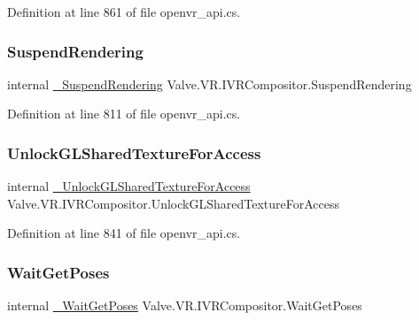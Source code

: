 Definition at line 861 of file openvr\+\_\+api.\+cs.

\mbox{\label{struct_valve_1_1_v_r_1_1_i_v_r_compositor_a9a65d3f0ab17d11d1771dcd4167d9092}} 
\subsubsection{\texorpdfstring{SuspendRendering}{SuspendRendering}}
{\footnotesize\ttfamily internal \mbox{\hyperlink{struct_valve_1_1_v_r_1_1_i_v_r_compositor_a52c4de7b702770e872b7ef001d8c6b32}{\+\_\+\+Suspend\+Rendering}} Valve.\+V\+R.\+I\+V\+R\+Compositor.\+Suspend\+Rendering}



Definition at line 811 of file openvr\+\_\+api.\+cs.

\mbox{\label{struct_valve_1_1_v_r_1_1_i_v_r_compositor_afee8c0932af2f5331c01b76b5023df45}} 
\subsubsection{\texorpdfstring{UnlockGLSharedTextureForAccess}{UnlockGLSharedTextureForAccess}}
{\footnotesize\ttfamily internal \mbox{\hyperlink{struct_valve_1_1_v_r_1_1_i_v_r_compositor_ad503ea42a467e1498243ff87b76188f0}{\+\_\+\+Unlock\+G\+L\+Shared\+Texture\+For\+Access}} Valve.\+V\+R.\+I\+V\+R\+Compositor.\+Unlock\+G\+L\+Shared\+Texture\+For\+Access}



Definition at line 841 of file openvr\+\_\+api.\+cs.

\mbox{\label{struct_valve_1_1_v_r_1_1_i_v_r_compositor_a6506c136d5242a72d1cab500c8e81edb}} 
\subsubsection{\texorpdfstring{WaitGetPoses}{WaitGetPoses}}
{\footnotesize\ttfamily internal \mbox{\hyperlink{struct_valve_1_1_v_r_1_1_i_v_r_compositor_a526e58af311d731d5802cb0d3736f7de}{\+\_\+\+Wait\+Get\+Poses}} Valve.\+V\+R.\+I\+V\+R\+Compositor.\+Wait\+Get\+Poses}



